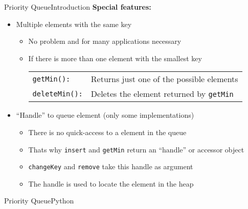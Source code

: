 
\begin{frame}{Priority Queue}{Introduction}
  \textbf{Special features:}
  \begin{itemize}
    \item
      Multiple elements with the same key
      \begin{itemize}
        \item
          No problem and for many applications necessary
        \item
          If there is more than one element with the smallest key
          \begin{tabular}{ll}
            {\color{Mittel-Blau}\texttt{getMin():}} &
            Returns just one of the possible elements\\
            {\color{Mittel-Blau}\texttt{deleteMin():}} &
            Deletes the element returned by
            {\color{Mittel-Blau}\texttt{getMin}}
          \end{tabular}
      \end{itemize}
      \vspace{0.5em}
    \item
      \enquote{Handle} to queue element (only some implementations)
      \begin{itemize}
        \item
          There is no quick-access to a element in the queue
        \item
          Thats why {\color{Mittel-Blau}\texttt{insert}} and
          {\color{Mittel-Blau}\texttt{getMin}} return an \enquote{handle}
          or accessor object
        \item
          {\color{Mittel-Blau}\texttt{changeKey}} and
          {\color{Mittel-Blau}\texttt{remove}} take this handle as argument
        \item
          The handle is used to locate the element in the heap
      \end{itemize}
  \end{itemize}
\end{frame}


\begin{frame}{Priority Queue}{Python}
  \vspace{-1.0em}
  
\end{frame}


